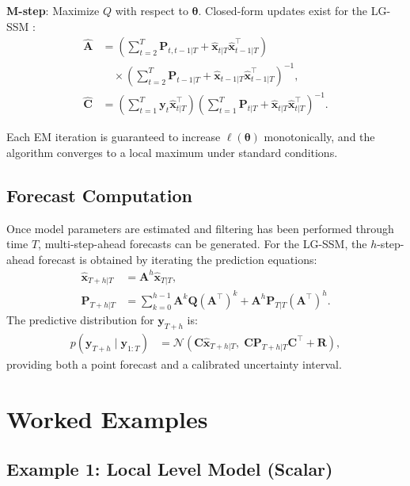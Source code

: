 \documentclass[conference]{IEEEtran}
\begin{document}
\textbf{M-step}: Maximize $Q$ with respect to $\boldsymbol{\theta}$. Closed-form updates exist for the LG-SSM \cite{shumway1982approach}:
\begin{align}
\hat{\mathbf{A}} &= \left(\sum_{t=2}^T \mathbf{P}_{t,t-1|T} + \hat{\mathbf{x}}_{t|T}\hat{\mathbf{x}}_{t-1|T}^\top\right) \nonumber\\
&\quad\times \left(\sum_{t=2}^T \mathbf{P}_{t-1|T} + \hat{\mathbf{x}}_{t-1|T}\hat{\mathbf{x}}_{t-1|T}^\top\right)^{-1}, \\
\hat{\mathbf{C}} &= \left(\sum_{t=1}^T \mathbf{y}_t \hat{\mathbf{x}}_{t|T}^\top\right)\left(\sum_{t=1}^T \mathbf{P}_{t|T} + \hat{\mathbf{x}}_{t|T}\hat{\mathbf{x}}_{t|T}^\top\right)^{-1}.
\end{align}

Each EM iteration is guaranteed to increase $\ell(\boldsymbol{\theta})$ monotonically, and the algorithm converges to a local maximum under standard conditions.

\subsection{Forecast Computation}

Once model parameters are estimated and filtering has been performed through time $T$, multi-step-ahead forecasts can be generated. For the LG-SSM, the $h$-step-ahead forecast is obtained by iterating the prediction equations:
\begin{align}
\hat{\mathbf{x}}_{T+h|T} &= \mathbf{A}^h \hat{\mathbf{x}}_{T|T}, \\
\mathbf{P}_{T+h|T} &= \sum_{k=0}^{h-1} \mathbf{A}^k \mathbf{Q} (\mathbf{A}^\top)^k + \mathbf{A}^h \mathbf{P}_{T|T} (\mathbf{A}^\top)^h.
\end{align}
The predictive distribution for $\mathbf{y}_{T+h}$ is:
\begin{align}
p(\mathbf{y}_{T+h} \mid \mathbf{y}_{1:T}) &= \mathcal{N}(\mathbf{C}\hat{\mathbf{x}}_{T+h|T}, \; \mathbf{C}\mathbf{P}_{T+h|T}\mathbf{C}^\top + \mathbf{R}),
\end{align}
providing both a point forecast and a calibrated uncertainty interval.

\section{Worked Examples}
\label{sec:examples}

\subsection{Example 1: Local Level Model (Scalar)}
\end{document}
